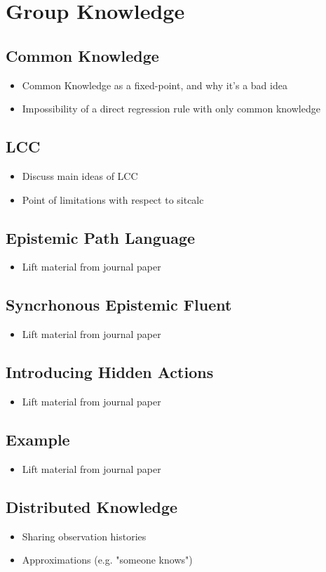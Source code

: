 \chapter{Group Knowledge}\label{ch:cknowledge}

\section{Common Knowledge}

\begin{itemize}
\item Common Knowledge as a fixed-point, and why it's a bad idea
\item Impossibility of a direct regression rule with only common knowledge
\end{itemize}

\section{LCC}
\begin{itemize}
\item Discuss main ideas of LCC
\item Point of limitations with respect to sitcalc
\end{itemize}

\section{Epistemic Path Language}
\begin{itemize}
\item Lift material from journal paper
\end{itemize}

\section{Syncrhonous Epistemic Fluent}
\begin{itemize}
\item Lift material from journal paper
\end{itemize}

\section{Introducing Hidden Actions}
\begin{itemize}
\item Lift material from journal paper
\end{itemize}

\section{Example}
\begin{itemize}
\item Lift material from journal paper
\end{itemize}

\section{Distributed Knowledge}

\begin{itemize}
\item Sharing observation histories
\item Approximations (e.g. "someone knows")
\end{itemize}


